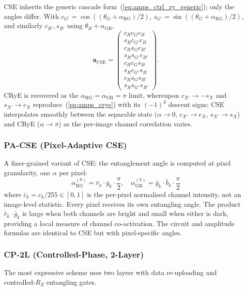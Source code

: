 \documentclass[conference,compsoc]{IEEEtran}
\begin{document}
CSE inherits the generic cascade form~(\ref{eq:amps_ctrl_ry_generic}); only the angles differ. With $c_{G'} = \cos((\theta_G + \alpha_\text{RG})/2)$, $s_{G'} = \sin((\theta_G + \alpha_\text{RG})/2)$, and similarly $c_{B'}, s_{B'}$ using $\theta_B + \alpha_\text{GB}$,
\begin{equation}
    \mathbf{a}_\text{CSE} = \begin{pmatrix} c_R c_G c_B \\ s_R c_{G'} c_B \\ c_R s_G c_{B'} \\ s_R s_{G'} c_{B'} \\ c_R c_G s_B \\ s_R c_{G'} s_B \\ c_R s_G s_{B'} \\ s_R s_{G'} s_{B'} \end{pmatrix}.
    \label{eq:amps_cse}
\end{equation}
CRyE is recovered as the $\alpha_\text{RG} = \alpha_\text{GB} = \pi$ limit, whereupon $c_{X'}\to -s_X$ and $s_{X'}\to c_X$ reproduce~(\ref{eq:amps_crye}) with its $(-1)^d$ descent signs; CSE interpolates smoothly between the separable state ($\alpha\to 0$, $c_{X'}\to c_X$, $s_{X'}\to s_X$) and CRyE ($\alpha\to\pi$) as the per-image channel correlation varies.

\subsubsection{PA-CSE (Pixel-Adaptive CSE)}
\label{sec:pa_cse}
A finer-grained variant of CSE: the entanglement angle is computed at pixel granularity, one $\alpha$ per pixel:
\begin{equation}
    \alpha_\text{RG}^{(k)} = \bar{r}_k \cdot \bar{g}_k \cdot \frac{\pi}{2}, \quad
    \alpha_\text{GB}^{(k)} = \bar{g}_k \cdot \bar{b}_k \cdot \frac{\pi}{2}
    \label{eq:pa_cse_angles}
\end{equation}
where $\bar{c}_k = c_k / 255 \in [0,1]$ is the per-pixel normalised channel intensity, not an image-level statistic. Every pixel receives its own entangling angle.
The product $\bar{r}_k \cdot \bar{g}_k$ is large when both channels are bright and small when either is dark, providing a local measure of channel co-activation.
The circuit and amplitude formulas are identical to CSE but with pixel-specific angles.

\subsubsection{CP-2L (Controlled-Phase, 2-Layer)}
\label{sec:cp2l}
The most expressive scheme uses two layers with data re-uploading and controlled-$R_Z$ entangling gates.
\end{document}
